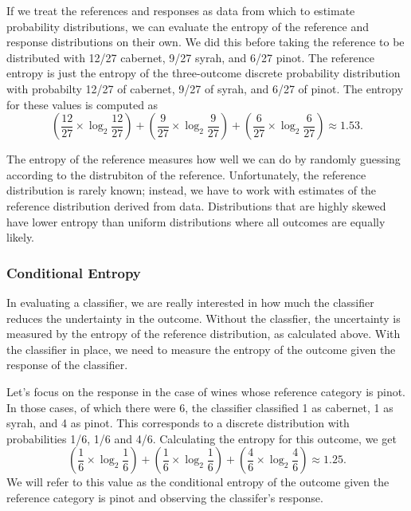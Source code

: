 If we treat the references and responses as data from which to
estimate probability distributions, we can evaluate the entropy of the
reference and response distributions on their own.  We did this before
taking the reference to be distributed with 12/27 cabernet, 9/27
syrah, and 6/27 pinot.  The reference entropy is just the entropy of
the three-outcome discrete probability distribution with probabilty
12/27 of cabernet, 9/27 of syrah, and 6/27 of pinot.  The entropy for
these values is computed as
%
\begin{equation}
\left( \frac{12}{27} \times \log_2 \frac{12}{27} \right)
+ \left( \frac{9}{27} \times \log_2 \frac{9}{27} \right)
+ \left( \frac{6}{27} \times \log_2 \frac{6}{27} \right)
\approx 1.53.
\end{equation}

The entropy of the reference measures how well we can do by randomly
guessing according to the distrubiton of the reference.
Unfortunately, the reference distribution is rarely known; instead, we
have to work with estimates of the reference distribution derived from
data.  Distributions that are highly skewed have lower entropy than
uniform distributions where all outcomes are equally likely.

\subsubsection{Conditional Entropy}

In evaluating a classifier, we are really interested in how much the
classifier reduces the undertainty in the outcome.  Without the classfier,
the uncertainty is measured by the entropy of the reference distribution,
as calculated above.  With the classifier in place, we need to measure
the entropy of the outcome given the response of the classifier.  

Let's focus on the response in the case of wines whose reference
category is pinot.  In those cases, of which there were 6, the
classifier classified 1 as cabernet, 1 as syrah, and 4 as pinot.  
This corresponds to a discrete distribution with probabilities
1/6, 1/6 and 4/6.  Calculating the entropy for this outcome, we
get
%
\begin{equation}
\left( \frac{1}{6} \times \log_2 \frac{1}{6} \right)
+ \left( \frac{1}{6} \times \log_2 \frac{1}{6} \right)
+ \left( \frac{4}{6} \times \log_2 \frac{4}{6} \right)
\approx 1.25.
\end{equation}
%
We will refer to this value as the conditional entropy of the outcome
given the reference category is pinot and observing the classifer's
response.

